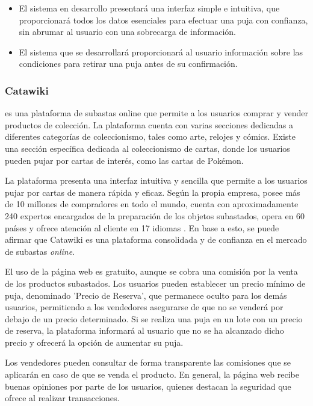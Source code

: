 \begin{itemize}
    \item El sistema en desarrollo presentará una interfaz simple e intuitiva, que proporcionará todos los datos esenciales para efectuar una puja con confianza, sin abrumar al usuario con una sobrecarga de información.
    \item El sistema que se desarrollará proporcionará al usuario información sobre las condiciones para retirar una puja antes de su confirmación.
\end{itemize}


\subsubsection{Catawiki}
 es una plataforma de subastas online que permite a los usuarios comprar y vender productos de colección. 
La plataforma cuenta con varias secciones dedicadas a diferentes categorías de coleccionismo, tales como arte, relojes y cómics. 
Existe una sección específica dedicada al coleccionismo de cartas, donde los usuarios pueden pujar por cartas de interés, como las cartas de Pokémon.

La plataforma presenta una interfaz intuitiva y sencilla que permite a los usuarios pujar por cartas de manera rápida y eficaz. Según la propia empresa, 
posee más de 10 millones de compradores en todo el mundo, cuenta con aproximadamente 240 expertos encargados de la preparación de los objetos subastados, 
opera en 60 países y ofrece atención al cliente en 17 idiomas \cite{catawiki}. En base a esto, se puede afirmar que Catawiki es una plataforma consolidada y de confianza en el mercado de subastas \textit{online}.

El uso de la página web es gratuito, aunque se cobra una comisión por la venta de los productos subastados.
Los usuarios pueden establecer un precio mínimo de puja, denominado 'Precio de Reserva', que permanece oculto para los demás usuarios, 
permitiendo a los vendedores asegurarse de que no se venderá por debajo de un precio determinado. 
Si se realiza una puja en un lote con un precio de reserva, la plataforma informará al usuario que no se ha alcanzado dicho precio y ofrecerá la opción de aumentar su puja.

Los vendedores pueden consultar de forma transparente las comisiones que se aplicarán en caso de que se venda el producto. 
En general, la página web recibe buenas opiniones por parte de los usuarios, quienes destacan la seguridad que ofrece al realizar transacciones.

